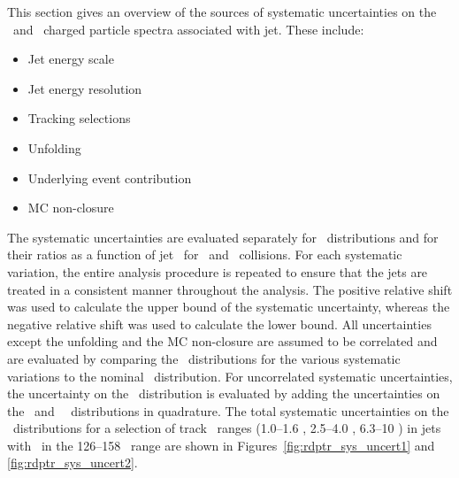 
This section gives an overview of the sources of systematic uncertainties on the \pp\ and \pbpb\ charged particle spectra associated with jet.
These include:

\begin{itemize}
\item Jet energy scale
\item Jet energy resolution
\item Tracking selections
\item Unfolding
\item Underlying event contribution
\item MC non-closure
\end{itemize}

The systematic uncertainties are evaluated separately for \Dptr\ distributions and for their ratios as a function of jet \pT\ for \pp\ and \pbpb\ collisions.
For each systematic variation, the entire analysis procedure is repeated to ensure that the jets are treated in a consistent manner throughout the analysis.
The positive relative shift was used to calculate the upper bound of the systematic uncertainty, whereas the negative relative shift was used to calculate the lower bound.
All uncertainties except the unfolding and the MC non-closure are assumed to be correlated and are evaluated by comparing the \Rdptr\ distributions for the various systematic variations to the nominal \Rdptr\ distribution.
For uncorrelated systematic uncertainties, the uncertainty on the \RDptr\ distribution is evaluated by adding the uncertainties on the \pp\ and \pbpb\ \Dptr\ distributions in quadrature.
The total systematic uncertainties on the \Rdptr\ distributions for a selection of track \pt\ ranges (1.0--1.6 \GeV, 2.5--4.0 \GeV, 6.3--10 \GeV) in jets with \pt\ in the 126--158 \GeV\ range are shown in Figures~\ref{fig:rdptr_sys_uncert1} and \ref{fig:rdptr_sys_uncert2}. 



